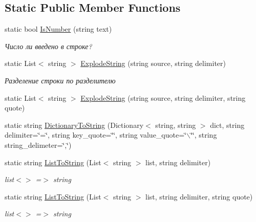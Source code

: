 \subsection*{Static Public Member Functions}
\begin{DoxyCompactItemize}
\item 
static bool \hyperlink{class_common_objects_1_1_common_a0e1ac9aab4bbc7ca5795ec1c6723d5c5}{IsNumber} (string text)
\begin{DoxyCompactList}\small\item\em Число ли введено в строке? \item\end{DoxyCompactList}\item 
static List$<$ string $>$ \hyperlink{class_common_objects_1_1_common_a27e95ea42c3ae768e52ac475cf946e3e}{ExplodeString} (string source, string delimiter)
\begin{DoxyCompactList}\small\item\em Разделение строки по разделителю \item\end{DoxyCompactList}\item 
static List$<$ string $>$ \hyperlink{class_common_objects_1_1_common_a8a961582ce85c659e60c6f1fe1f093be}{ExplodeString} (string source, string delimiter, string quote)
\item 
static string \hyperlink{class_common_objects_1_1_common_ac5418ec56a1dad138de41412d520e1b9}{DictionaryToString} (Dictionary$<$ string, string $>$ dict, string delimiter=\char`\"{}=\char`\"{}, string key\_\-quote=\char`\"{}\char`\"{}, string value\_\-quote=\char`\"{}$\backslash$\char`\"{}\char`\"{}, string string\_\-delimeter=\char`\"{},\char`\"{})
\item 
static string \hyperlink{class_common_objects_1_1_common_a3713b3726e55e6773b665af94d7c2582}{ListToString} (List$<$ string $>$ list, string delimiter)
\begin{DoxyCompactList}\small\item\em list$<$$>$ =$>$ string \item\end{DoxyCompactList}\item 
static string \hyperlink{class_common_objects_1_1_common_a0492f157bdcba00da057bf1d90326536}{ListToString} (List$<$ string $>$ list, string delimiter, string quote)
\begin{DoxyCompactList}\small\item\em list$<$$>$ =$>$ string \item\end{DoxyCompactList}\item 

\end{DoxyCompactItemize}
